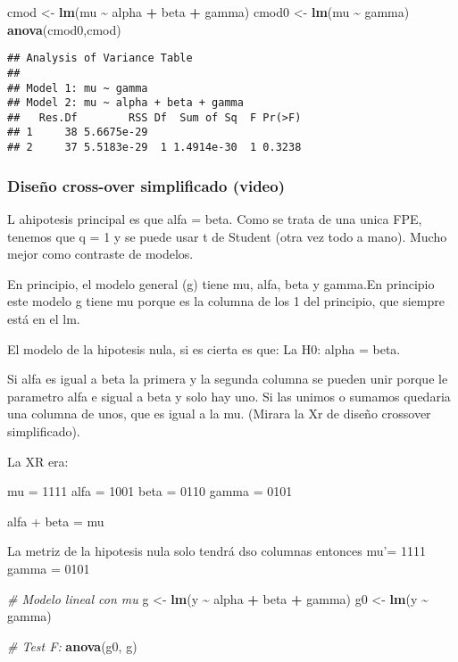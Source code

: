 \documentclass[
]{article}
\newenvironment{Shaded}{\begin{snugshade}}{\end{snugshade}}
\newcommand{\CommentTok}[1]{\textcolor[rgb]{0.56,0.35,0.01}{\textit{#1}}}
\newcommand{\FunctionTok}[1]{\textcolor[rgb]{0.13,0.29,0.53}{\textbf{#1}}}
\newcommand{\NormalTok}[1]{#1}
\newcommand{\OtherTok}[1]{\textcolor[rgb]{0.56,0.35,0.01}{#1}}
\newcommand{\SpecialCharTok}[1]{\textcolor[rgb]{0.81,0.36,0.00}{\textbf{#1}}}
\begin{document}
\begin{Shaded}
\begin{Highlighting}[]
\NormalTok{cmod }\OtherTok{\textless{}{-}} \FunctionTok{lm}\NormalTok{(mu }\SpecialCharTok{\textasciitilde{}}\NormalTok{ alpha }\SpecialCharTok{+}\NormalTok{ beta }\SpecialCharTok{+}\NormalTok{ gamma)}
\NormalTok{cmod0 }\OtherTok{\textless{}{-}} \FunctionTok{lm}\NormalTok{(mu }\SpecialCharTok{\textasciitilde{}}\NormalTok{ gamma)}
\FunctionTok{anova}\NormalTok{(cmod0,cmod)}
\end{Highlighting}
\end{Shaded}

\begin{verbatim}
## Analysis of Variance Table
## 
## Model 1: mu ~ gamma
## Model 2: mu ~ alpha + beta + gamma
##   Res.Df        RSS Df  Sum of Sq  F Pr(>F)
## 1     38 5.6675e-29                        
## 2     37 5.5183e-29  1 1.4914e-30  1 0.3238
\end{verbatim}

\hypertarget{diseuxf1o-cross-over-simplificado-video}{%
\subsubsection{Diseño cross-over simplificado
(video)}\label{diseuxf1o-cross-over-simplificado-video}}

L ahipotesis principal es que alfa = beta. Como se trata de una unica
FPE, tenemos que q = 1 y se puede usar t de Student (otra vez todo a
mano). Mucho mejor como contraste de modelos.

En principio, el modelo general (g) tiene mu, alfa, beta y gamma.En
principio este modelo g tiene mu porque es la columna de los 1 del
principio, que siempre está en el lm.

El modelo de la hipotesis nula, si es cierta es que: La H0: alpha =
beta.

Si alfa es igual a beta la primera y la segunda columna se pueden unir
porque le parametro alfa e sigual a beta y solo hay uno. Si las unimos o
sumamos quedaria una columna de unos, que es igual a la mu. (Mirara la
Xr de diseño crossover simplificado).

La XR era:

mu = 1111 alfa = 1001 beta = 0110 gamma = 0101

alfa + beta = mu

La metriz de la hipotesis nula solo tendrá dso columnas entonces mu'=
1111 gamma = 0101

\begin{Shaded}
\begin{Highlighting}[]
\CommentTok{\# Modelo lineal con mu}
\NormalTok{g }\OtherTok{\textless{}{-}} \FunctionTok{lm}\NormalTok{(y }\SpecialCharTok{\textasciitilde{}}\NormalTok{ alpha }\SpecialCharTok{+}\NormalTok{ beta }\SpecialCharTok{+}\NormalTok{ gamma)}
\NormalTok{g0 }\OtherTok{\textless{}{-}} \FunctionTok{lm}\NormalTok{(y }\SpecialCharTok{\textasciitilde{}}\NormalTok{  gamma)}

\CommentTok{\# Test F:}
\FunctionTok{anova}\NormalTok{(g0, g)}
\end{Highlighting}
\end{Shaded}
\end{document}
